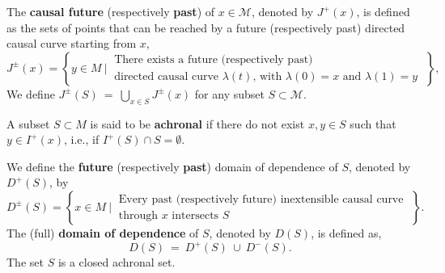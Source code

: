\documentclass[11pt]{book}
\newcommand{\Mcal}{\mathcal{M}}
\theoremstyle{break}
\newtheorem{definition}{Definition}[chapter]
\begin{document}
%
The \textbf{causal future} (respectively \textbf{past}) of $x \in \Mcal$, denoted by $J^{+}(x)$, is defined as the sets of points that can be reached by a future (respectively past) directed causal curve starting from $x$,
%
\begin{equation*}
J^{\pm}(x) = \left\{ y \in M \ \bigg| \ \begin{array}{l} \text{There exists a future (respectively past)} \\ \text{directed causal curve $\lambda(t)$, with $\lambda(0)=x$ and $\lambda(1)=y$} \end{array} \; \right\},
\end{equation*}
We define $J^{\pm}(S) \ = \ \bigcup_{x \in S} J^{\pm}(x)$ for any subset $S \subset \Mcal$.
%










A subset $S \subset M$ is said to be \textbf{achronal} if there do not exist $x, y \in S$ such that $y \in I^{+}(x)$, i.e., if $I^{+}(S) \cap S = \emptyset$. 




We define the \textbf{future} (respectively \textbf{past}) domain of dependence of $S$, denoted by $D^{+}(S)$, by
%
\begin{equation*}
D^{\pm}(S) = \left\{ x \in M \ \bigg| \ \begin{array}{l} \text{Every past (respectively future) inextensible causal curve} \\ \text{through $x$ intersects $S$} \end{array} \; \right\}.
\end{equation*}
%
The (full) \textbf{domain of dependence} of $S$, denoted by $D(S)$, is defined as,
\begin{equation*}
D(S) \ = \ D^{+}(S) \ \cup \ D^{-}(S).
\end{equation*}
The set $S$ is a closed achronal set.
\end{document}
